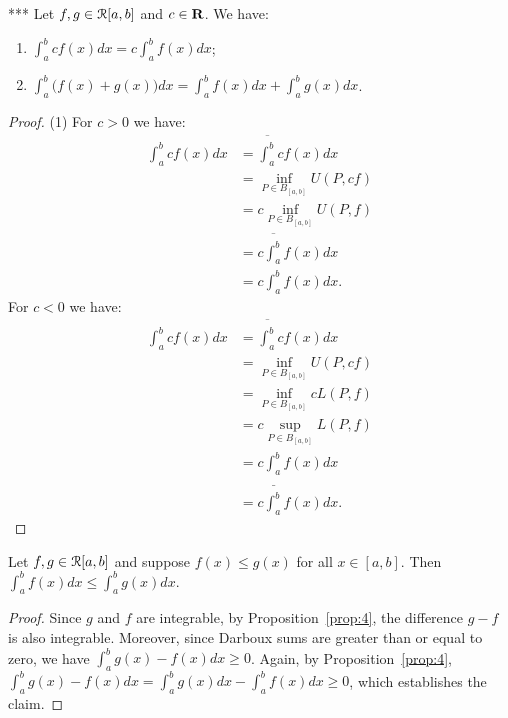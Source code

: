 \documentclass[11pt,twoside,openany]{memoir}
\begin{document}
    \begin{corollary}***
        Let $f,g \in \mathcal{R}[a,b]$ and $c \in \mathbf{R}$. We have:
            \begin{enumerate}[label = (\arabic*),itemsep=1pt,topsep=3pt]
                \item $\int_a^b cf(x)dx  = c \int_a^b f(x)dx$;
                \item $\int_a^b \bigl(f(x) + g(x)\bigr)dx = \int_a^b f(x)dx + \int_a^b g(x)dx$.
            \end{enumerate}
    \end{corollary}
        \begin{proof}
            (1) For $c > 0$ we have:
                    \begin{equation*}
                    \begin{split}
                        \int_a^bcf(x)dx
                        & = \overline{\int_a^b}cf(x)dx \\
                        & = \inf_{P \in B_{[a,b]}}U(P,cf) \\
                        & = c\inf_{P \in B_{[a,b]}}U(P,f) \\
                        & = c\overline{\int_a^b}f(x)dx \\
                        & = c\int_a^bf(x)dx.
                    \end{split}
                    \end{equation*}
                For $c < 0$ we have:
                    \begin{equation*}
                    \begin{split}
                        \int_a^bcf(x)dx
                        & = \overline{\int_a^b}cf(x)dx \\
                        & = \inf_{P \in B_{[a,b]}}U(P,cf) \\
                        & = \inf_{P \in B_{[a,b]}}cL(P,f) \\
                        & = c\sup_{P \in B_{[a,b]}}L(P,f) \\
                        & = c\underline{\int_a^b}f(x)dx \\
                        & = c\int_a^bf(x)dx.
                    \end{split}
                    \end{equation*}
        \end{proof}

    
    \begin{corollary}\label{cor:6}
        Let $f,g \in \mathcal{R}[a,b]$ and suppose $f(x) \leq g(x)$ for all $x \in [a,b]$. Then $\int_a^b f(x)dx \leq \int_a^b g(x)dx$.
    \end{corollary}
        \begin{proof}
            Since $g$ and $f$ are integrable, by Proposition~\ref{prop:4}, the difference $g - f$ is also integrable. Moreover, since Darboux sums are greater than or equal to zero, we have $\int_a^b g(x) - f(x)dx \geq 0$. Again, by Proposition~\ref{prop:4}, $\int_a^b g(x) - f(x) dx = \int_a^b g(x)dx - \int_a^b f(x)dx \geq 0$, which establishes the claim. 
        \end{proof}
\end{document}
